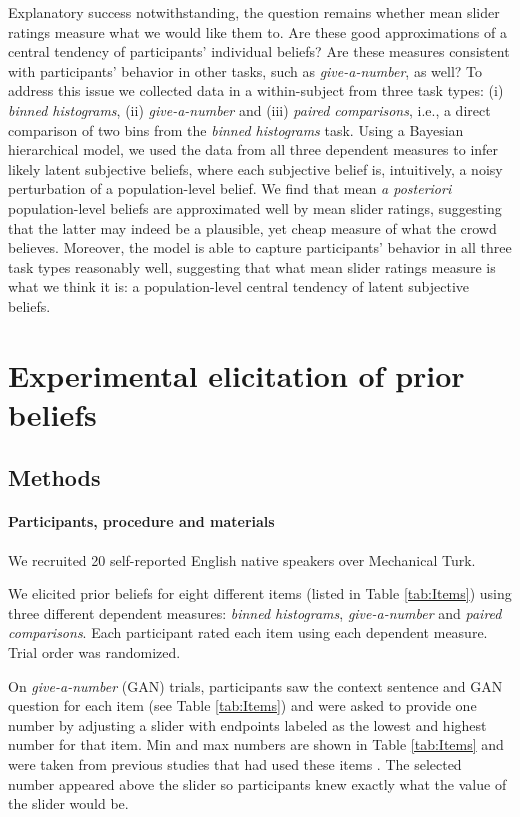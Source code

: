\documentclass[10pt,letterpaper]{article}
\newcommand{\tableref}[1]{Table \ref{#1}}
\begin{document}
Explanatory success notwithstanding, the question remains whether mean slider ratings measure
what we would like them to. Are these good approximations of a central tendency of participants'
individual beliefs? Are these measures consistent with participants' behavior in other tasks, such
as \emph{give-a-number}, as well? To address this issue we collected data in a within-subject
from three task types: (i) \emph{binned histograms}, (ii) \emph{give-a-number} and (iii)
\emph{paired comparisons}, i.e., a direct comparison of two bins from the \emph{binned
  histograms} task. Using a Bayesian hierarchical model, we used the data from all three
dependent measures to infer likely latent subjective beliefs, where each subjective belief is,
intuitively, a noisy perturbation of a population-level belief. We find that mean \emph{a
  posteriori} population-level beliefs are approximated well by mean slider ratings, suggesting
that the latter may indeed be a plausible, yet cheap measure of what the crowd believes.
Moreover, the model is able to capture participants' behavior in all three task types reasonably
well, suggesting that what mean slider ratings measure is what we think it is: a population-level
central tendency of latent subjective beliefs.

\section{Experimental elicitation of prior beliefs}

\subsection{Methods} 

\paragraph{Participants, procedure and materials} We recruited 20 self-reported English native speakers  over Mechanical Turk.


We elicited prior beliefs for eight different items (listed in
\tableref{tab:Items}) using three different dependent measures: \emph{binned histograms},
\emph{give-a-number} and \emph{paired comparisons}. Each participant rated each item using each
dependent measure. Trial order was randomized.



On \emph{give-a-number} (GAN) trials, participants saw the context sentence and GAN question
for each item (see \tableref{tab:Items}) and were asked to provide one number by adjusting a
slider with endpoints labeled as the lowest and highest number for that item. Min and max
numbers are shown in \tableref{tab:Items} and were taken from previous studies that had used
these items
\cite{DegenTessler2015:Wonky-worlds:-L,SchollerFranke2015:Semantic-values,KaoWu2014:Nonliteral-Unde}. The
selected number appeared above the slider so participants knew exactly what the value of the
slider would be.
\end{document}
